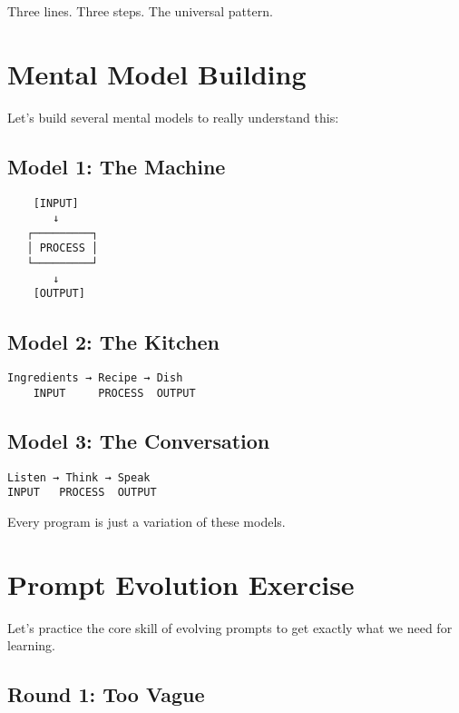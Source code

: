 \documentclass[
  letterpaper,
  DIV=11,
  numbers=noendperiod,
  oneside]{scrreprt}
\begin{document}
Three lines. Three steps. The universal pattern.

\section{Mental Model Building}\label{mental-model-building}

Let's build several mental models to really understand this:

\subsection{Model 1: The Machine}\label{model-1-the-machine}

\begin{verbatim}
    [INPUT]
       ↓
   ┌─────────┐
   │ PROCESS │
   └─────────┘
       ↓
    [OUTPUT]
\end{verbatim}

\subsection{Model 2: The Kitchen}\label{model-2-the-kitchen}

\begin{verbatim}
Ingredients → Recipe → Dish
    INPUT     PROCESS  OUTPUT
\end{verbatim}

\subsection{Model 3: The Conversation}\label{model-3-the-conversation}

\begin{verbatim}
Listen → Think → Speak
INPUT   PROCESS  OUTPUT
\end{verbatim}

Every program is just a variation of these models.

\section{Prompt Evolution Exercise}\label{prompt-evolution-exercise}

Let's practice the core skill of evolving prompts to get exactly what we
need for learning.

\subsection{Round 1: Too Vague}\label{round-1-too-vague}
\end{document}
